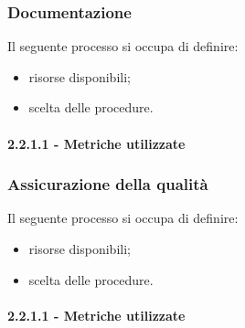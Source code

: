 \subsubsection{Documentazione}
Il seguente processo si occupa di definire:
\begin{itemize}
    \item risorse disponibili;
    \item scelta delle procedure.
\end{itemize}
\paragraph{2.2.1.1 - Metriche utilizzate}

\subsubsection{Assicurazione della qualità}
Il seguente processo si occupa di definire:
\begin{itemize}
    \item risorse disponibili;
    \item scelta delle procedure.
\end{itemize}
\paragraph{2.2.1.1 - Metriche utilizzate}


\newpage
